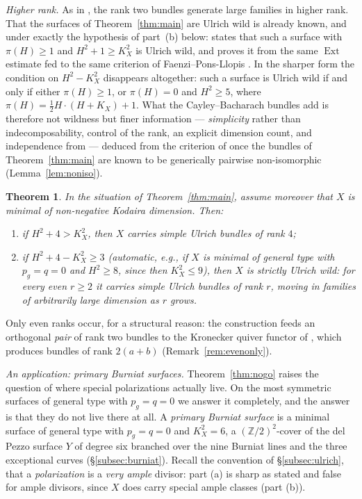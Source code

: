 \documentclass[10pt,a4paper]{amsart}
\newtheorem{theorem}{Theorem}[section]
\newcommand{\ZZ}{\mathbb{Z}}
\newcommand{\Ext}{\operatorname{Ext}}
\begin{document}
\smallskip
\noindent\emph{Higher rank.} As in \cite{CHGS12,Cas17,CasWild}, the rank two bundles generate large families in higher rank. That the surfaces of Theorem~\ref{thm:main} are Ulrich wild is already known, and under exactly the hypothesis of part~(b) below: \cite[Lem.~5.2]{Cas17} states that such a surface with $\pi(H)\ge1$ and $H^2+1\ge K_X^2$ is Ulrich wild, and proves it from the same $\Ext$ estimate fed to the same criterion of Faenzi--Pons-Llopis \cite{FPL}. In the sharper form \cite[Thm.~1.3]{Cas17} the condition on $H^2-K_X^2$ disappears altogether: such a surface is Ulrich wild if and only if either $\pi(H)\ge1$, or $\pi(H)=0$ and $H^2\ge5$, where $\pi(H)=\tfrac12H\cdot(H+K_X)+1$. What the Cayley--Bacharach bundles add is therefore not wildness but finer information --- \emph{simplicity} rather than indecomposability, control of the rank, an explicit dimension count, and independence from \cite[Thm.~1.2]{Cas17} --- deduced from the criterion of \cite{FPL} once the bundles of Theorem~\ref{thm:main} are known to be generically pairwise non-isomorphic (Lemma~\ref{lem:noniso}).

\begin{theorem}\label{thm:evenrank}
In the situation of Theorem~\ref{thm:main}, assume moreover that $X$ is minimal of non-negative Kodaira dimension. Then:
\begin{enumerate}[label=\textup{(\alph*)}]
\item if $H^2+4>K_X^2$, then $X$ carries simple Ulrich bundles of rank $4$;
\item if $H^2+4-K_X^2\ge 3$ \textup{(}automatic, e.g., if $X$ is minimal of general type with $p_g=q=0$ and $H^2\ge 8$, since then $K_X^2\le 9$\textup{)}, then $X$ is strictly Ulrich wild: for every even $r\ge2$ it carries simple Ulrich bundles of rank $r$, moving in families of arbitrarily large dimension as $r$ grows.
\end{enumerate}
\end{theorem}

Only even ranks occur, for a structural reason: the construction feeds an orthogonal \emph{pair} of rank two bundles to the Kronecker quiver functor of \cite{FPL}, which produces bundles of rank $2(a+b)$ (Remark~\ref{rem:evenonly}).

\smallskip
\noindent\emph{An application: primary Burniat surfaces.} Theorem~\ref{thm:nogo} raises the question of where special polarizations actually live. On the most symmetric surfaces of general type with $p_g=q=0$ we answer it completely, and the answer is that they do not live there at all. A \emph{primary Burniat surface} is a minimal surface of general type with $p_g=q=0$ and $K_X^2=6$, a $(\ZZ/2)^2$-cover of the del Pezzo surface $Y$ of degree six branched over the nine Burniat lines and the three exceptional curves (\S\ref{subsec:burniat}). Recall the convention of \S\ref{subsec:ulrich}, that a \emph{polarization} is a \emph{very ample} divisor: part (a) is sharp as stated and false for ample divisors, since $X$ does carry special ample classes (part (b)).
\end{document}
